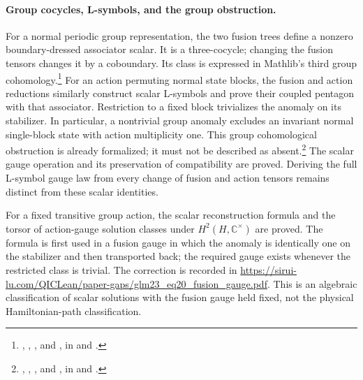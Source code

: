 \documentclass{article}
\begin{document}
\paragraph{Group cocycles, L-symbols, and the group obstruction.}
For a normal periodic group representation, the two fusion trees define a
nonzero boundary-dressed associator scalar. It is a three-cocycle; changing
the fusion tensors changes it by a coboundary. Its class is expressed in
Mathlib's third group cohomology.\footnote{
    ,
    ,
    , and
    , in
     and
    .}
For an action permuting normal state blocks, the fusion and action
reductions similarly construct scalar L-symbols and prove their coupled
pentagon with that associator. Restriction to a fixed block trivializes
the anomaly on its stabilizer. In particular, a nontrivial group anomaly
excludes an invariant normal single-block state with action multiplicity
one. This group cohomological obstruction is already formalized; it must
not be described as absent.\footnote{
    ,
    ,
    ,
    and
    ,
    in  and
    .}
The scalar gauge operation and its preservation of compatibility are
proved. Deriving the full L-symbol gauge law from every change of
fusion and action tensors remains distinct from these scalar identities.

For a fixed transitive group action, the scalar reconstruction formula and
the torsor of action-gauge solution classes under
$H^2(H,\mathbb C^\times)$ are proved. The formula is first used in a fusion
gauge in which the anomaly is identically one on the stabilizer and then
transported back; the required gauge exists whenever the restricted class
is trivial. The correction is recorded in
\url{https://sirui-lu.com/QICLean/paper-gaps/glm23_eq20_fusion_gauge.pdf}. This is an algebraic classification of
scalar solutions with the fusion gauge held fixed, not the physical
Hamiltonian-path classification.
\end{document}
